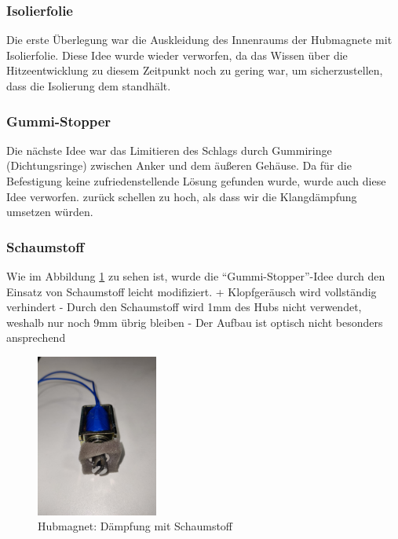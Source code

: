 \subsubsection{Isolierfolie}

Die erste Überlegung war die Auskleidung des Innenraums der Hubmagnete mit Isolierfolie.
Diese Idee wurde wieder verworfen, da das Wissen über die Hitzeentwicklung zu diesem Zeitpunkt noch zu gering war, um sicherzustellen, dass die Isolierung dem standhält. %

\subsubsection{Gummi-Stopper}

Die nächste Idee war das Limitieren des Schlags durch Gummiringe (Dichtungsringe) %
zwischen Anker und dem äußeren Gehäuse.
Da für die Befestigung keine zufriedenstellende Lösung gefunden wurde, wurde auch diese Idee verworfen.
zurück schellen zu hoch, als dass wir die Klangdämpfung umsetzen würden. %

\subsubsection{Schaumstoff}

Wie im Abbildung \ref{fig:schaumstoff} zu sehen ist, wurde die \enquote{Gummi-Stopper}-Idee durch den Einsatz von Schaumstoff leicht modifiziert. \newline
+ Klopfgeräusch wird vollständig verhindert \newline
- Durch den Schaumstoff wird 1mm des Hubs nicht verwendet, weshalb nur noch 9mm übrig bleiben \newline
- Der Aufbau ist optisch nicht besonders ansprechend

\begin{figure}[htbp]
    \centering
    \includegraphics [width=4cm] {img/Daempfung_Schaumstoff}
    \caption{Hubmagnet: Dämpfung mit Schaumstoff}
    \label{fig:schaumstoff}
\end{figure}

